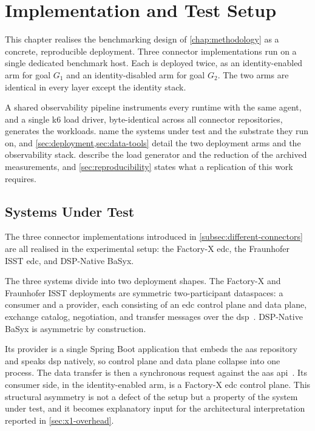 \chapter{Implementation and Test Setup}\label{chap:implementation}

This chapter realises the benchmarking design of \cref{chap:methodology} as a concrete, reproducible deployment. Three connector implementations run on a single dedicated benchmark host. Each is deployed twice, as an identity-enabled arm for goal $G_1$ and an identity-disabled arm for goal $G_2$. The two arms are identical in every layer except the identity stack.

A shared observability pipeline instruments every runtime with the same agent, and a single k6 load driver, byte-identical across all connector repositories, generates the workloads.  name the systems under test and the substrate they run on, and \cref{sec:deployment,sec:data-tools} detail the two deployment arms and the observability stack.  describe the load generator and the reduction of the archived measurements, and \cref{sec:reproducibility} states what a replication of this work requires.


\section{Systems Under Test}\label{sec:sut}

The three connector implementations introduced in \cref{subsec:different-connectors} are all realised in the experimental setup: the Factory-X \gls{edc}, the Fraunhofer ISST \gls{edc}, and DSP-Native BaSyx.

The three systems divide into two deployment shapes. The Factory-X and Fraunhofer ISST deployments are symmetric two-participant dataspaces: a consumer and a provider, each consisting of an \gls{edc} control plane and data plane, exchange catalog, negotiation, and transfer messages over the \gls{dsp}~\citep{datapsaceProtocol2025}. DSP-Native BaSyx is asymmetric by construction.

Its provider is a single Spring Boot application that embeds the \gls{aas} repository and speaks \gls{dsp} natively, so control plane and data plane collapse into one process. The data transfer is then a synchronous request against the \gls{aas} \gls{api}~\citep{dspNativeBasyx}. Its consumer side, in the identity-enabled arm, is a Factory-X \gls{edc} control plane. This structural asymmetry is not a defect of the setup but a property of the system under test, and it becomes explanatory input for the architectural interpretation reported in \cref{sec:x1-overhead}.

